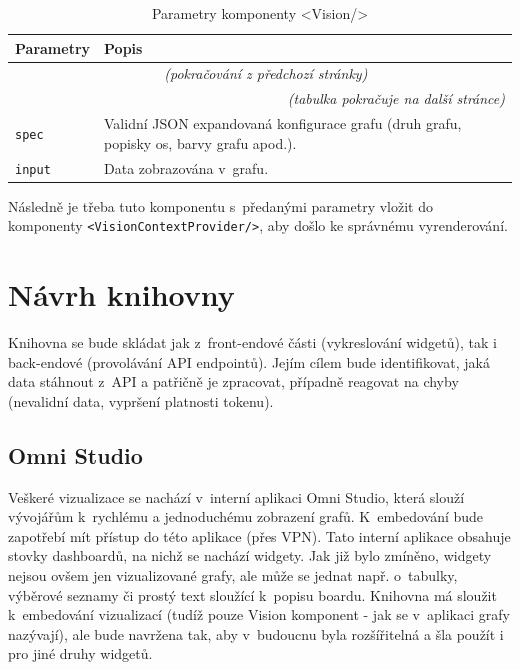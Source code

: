 \documentclass[czech, bc, kiv, he, iso690numb]{fasthesis}
\begin{document}
	\begin{longtable}{p{}p{}}
	\caption{Parametry komponenty <Vision/>}
	\label{tab:visionParams}\\
	\toprule[1.5pt]
	\textbf{Parametry} & \textbf{Popis}\\
	\midrule
	\endfirsthead
	\multicolumn{2}{c}{\tablename{}~\thetable{} \textit{(pokračování z předchozí stránky)}}\\
	\endhead
	\midrule
	\multicolumn{2}{r}{\textit{(tabulka pokračuje na další stránce)}}\\
	\endfoot
	\bottomrule[1.5pt]
	\endlastfoot
	\verb"spec" & Validní JSON expandovaná konfigurace grafu (druh grafu, popisky os, barvy grafu apod.). \\
	\midrule
	\verb"input" &  Data zobrazována v~grafu. \\
	\end{longtable}

Následně je třeba tuto komponentu s~předanými parametry vložit do komponenty \texttt{<VisionContextProvider/>}, aby došlo ke správnému vyrenderování.

\section{Návrh knihovny}

Knihovna se bude skládat jak z~front-endové části (vykreslování widgetů), tak i back-endové (provolávání API endpointů). Jejím cílem bude identifikovat, jaká data stáhnout z~API a patřičně je zpracovat, případně reagovat na chyby (nevalidní data, vypršení platnosti tokenu).
\subsection{Omni Studio}
Veškeré vizualizace se nachází v~interní aplikaci Omni Studio, která slouží vývojářům k~rychlému a jednoduchému zobrazení grafů. K~embedování bude zapotřebí mít přístup do této aplikace (přes VPN). Tato interní aplikace
obsahuje stovky dashboardů, na nichž se nachází widgety. Jak již bylo zmíněno, widgety nejsou ovšem jen vizualizované grafy, ale může se jednat např. o~tabulky, výběrové seznamy či prostý text sloužící k~popisu boardu.
Knihovna má sloužit k~embedování vizualizací (tudíž pouze Vision komponent - jak se v~aplikaci grafy nazývají), ale bude navržena tak, aby v~budoucnu byla rozšířitelná a šla použít i pro jiné druhy widgetů.
\end{document}
